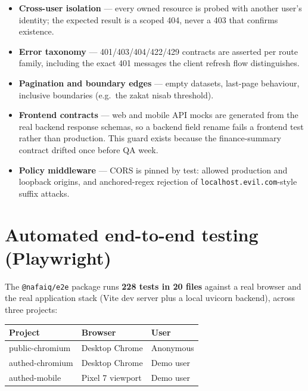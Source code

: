 \documentclass[11pt,a4paper]{article}
\begin{document}
\begin{itemize}
  \item \textbf{Cross-user isolation} --- every owned resource is probed with
        another user's identity; the expected result is a scoped 404, never a
        403 that confirms existence.
  \item \textbf{Error taxonomy} --- 401/403/404/422/429 contracts are asserted per
        route family, including the exact 401 messages the client refresh flow
        distinguishes.
  \item \textbf{Pagination and boundary edges} --- empty datasets, last-page
        behaviour, inclusive boundaries (e.g.\ the zakat nisab threshold).
  \item \textbf{Frontend contracts} --- web and mobile API mocks are generated
        from the real backend response schemas, so a backend field rename fails
        a frontend test rather than production. This guard exists because the
        finance-summary contract drifted once before QA week.
  \item \textbf{Policy middleware} --- CORS is pinned by test: allowed production
        and loopback origins, and anchored-regex rejection of
        \texttt{localhost.evil.com}-style suffix attacks.
\end{itemize}

\section{Automated end-to-end testing (Playwright)}\label{sec:e2e}

The \texttt{@nafaiq/e2e} package runs \textbf{228 tests in 20 files} against a real
browser and the real application stack (Vite dev server plus a local uvicorn
backend), across three projects:

\begin{center}
\begin{tabular}{lll}
\toprule
\textbf{Project} & \textbf{Browser} & \textbf{User} \\
\midrule
public-chromium & Desktop Chrome & Anonymous \\
authed-chromium & Desktop Chrome & Demo user \\
authed-mobile & Pixel 7 viewport & Demo user \\
\bottomrule
\end{tabular}
\end{center}
\end{document}

